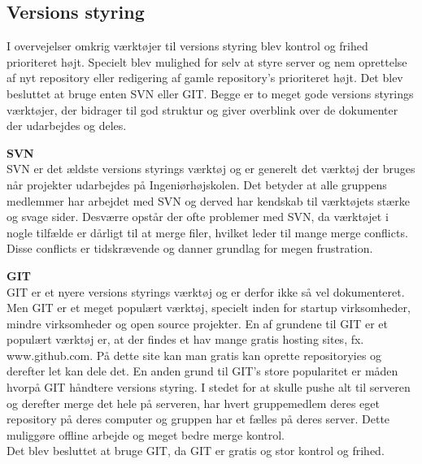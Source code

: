 \subsection*{Versions styring}
I overvejelser omkrig værktøjer til versions styring blev kontrol og frihed prioriteret højt. Specielt blev mulighed for selv at styre server og nem oprettelse af nyt repository eller redigering af gamle repository's prioriteret højt.
Det blev besluttet at bruge enten SVN eller GIT. Begge er to meget gode versions styrings værktøjer, der bidrager til god struktur og giver overblink over de dokumenter der udarbejdes og deles. 


\textbf{SVN} \\
SVN er det ældste versions styrings værktøj og er generelt det værktøj der bruges når projekter udarbejdes på Ingeniørhøjskolen. Det betyder at alle gruppens medlemmer har arbejdet med SVN og derved har kendskab til værktøjets stærke og svage sider. 
Desværre opstår der ofte problemer med SVN, da værktøjet i nogle tilfælde er dårligt til at merge filer, hvilket leder til mange merge conflicts. Disse conflicts er tidskrævende og danner grundlag for megen frustration. 

\textbf{GIT} \\
GIT er et nyere versions styrings værktøj og er derfor ikke så vel dokumenteret.
Men GIT er et meget populært værktøj, specielt inden for startup virksomheder, mindre virksomheder og open source projekter. 
En af grundene til GIT er et populært værktøj er, at der findes et hav mange gratis hosting sites, fx. www.github.com. På dette site kan man gratis kan oprette repositoryies og derefter let kan dele det. 
En anden grund til GIT's store popularitet er måden hvorpå GIT håndtere versions styring. I stedet for at skulle pushe alt til serveren og derefter merge det hele på serveren, har hvert gruppemedlem deres eget repository på deres computer og gruppen har et fælles på deres server. Dette muliggøre offline arbejde og meget bedre merge kontrol. \\

Det blev besluttet at bruge GIT, da GIT er gratis og stor kontrol og frihed.